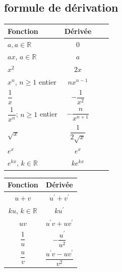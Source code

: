     \subsection{formule de dérivation}
    
    \begin{minipage}[c]{0.48\linewidth}
    	\begin{center}
    		\renewcommand{\arraystretch}{2}
    		\begin{tabular}{|Xc|Xc|}
    			\hline Fonction & Dérivée \\
    			\hline $a, a \in \mathbb{R}$ & 0 \\
    			\hline $a x$, $a \in \mathbb{R}$ & $a$ \\
    			\hline $x^2$ & $2 x$ \\
    			\hline $x^n$, $n \geqslant 1$ entier & $n x^{n-1}$ \\
    			\hline $\dfrac{1}{x}$ & $-\dfrac{1}{x^2}$ \\
    			\hline $\dfrac{1}{x^n}$; $n \geqslant 1$ entier & $-\dfrac{n}{x^{n+1}}$ \\
    			\hline $\sqrt{x}$ & $\dfrac{1}{2 \sqrt{x}}$ \\
    			\hline $e^x$ & $e^x$ \\
    			\hline $e^{k x}$, $k \in \mathbb{R}$ & $k e^{k x}$ \\
    			\hline
    		\end{tabular}
    	\end{center}
    	
    \end{minipage} \hfill
    \begin{minipage}[c]{0.48\linewidth}
    	\begin{center}
    		\renewcommand{\arraystretch}{2}
    		\begin{tabular}{|c|c|}
    			\hline Fonction & Dérivée \\
    			\hline$u+v$ & $u^{\prime}+v^{\prime}$ \\
    			\hline$k u$, $k \in \mathbb{R}$ & $k u^{\prime}$ \\
    			\hline$u v$ & $u^{\prime} v+u v^{\prime}$ \\
    			\hline$\dfrac{1}{u}$ & $-\dfrac{u^{\prime}}{u^2}$ \\
    			\hline$\dfrac{u}{v}$ & $\dfrac{u^{\prime} v-u v^{\prime}}{v^2}$ \\
    			\hline
    		\end{tabular}
    	\end{center}
    \end{minipage}
    
